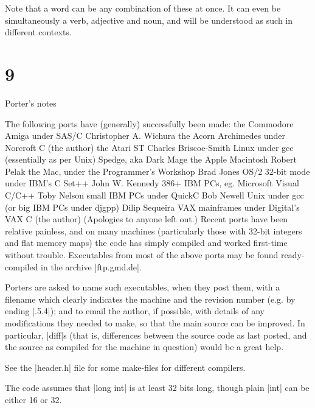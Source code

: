 Note that a word can be any combination of these at once.  It can even be
simultaneously a verb, adjective and noun, and will be understood as such
in different contexts.

\vfill\eject
\section{9}{Porter's notes}

The following ports have (generally) successfully been made:
\beginstt
  the Commodore Amiga under SAS/C              Christopher A. Wichura
  the Acorn Archimedes under Norcroft C        (the author)
  the Atari ST                                 Charles Briscoe-Smith
  Linux under gcc (essentially as per Unix)    Spedge, aka Dark Mage
  the Apple Macintosh                          Robert Pelak
  the Mac, under the Programmer's Workshop     Brad Jones
  OS/2 32-bit mode under IBM's C Set++         John W. Kennedy
  386+ IBM PCs, eg. Microsoft Visual C/C++     Toby Nelson
  small IBM PCs under QuickC                   Bob Newell
  Unix under gcc (or big IBM PCs under djgpp)  Dilip Sequeira
  VAX mainframes under Digital's VAX C         (the author)
\endtt
(Apologies to anyone left out.)  Recent ports have been relative painless,
and on many machines (particularly those with 32-bit integers and flat
memory maps) the code has simply compiled and worked first-time without
trouble.  Executables from most of the above ports may be found
ready-compiled in the archive |ftp.gmd.de|.

Porters are asked to name such executables, when they post them, with
a filename which clearly indicates the machine and the revision number
(e.g. by ending |.5.4|); and to email the author, if possible, with
details of any modifications they needed to make, so that the main
source can be improved.  In particular, |diff|s (that is, differences
between the source code as last posted, and the source as compiled
for the machine in question) would be a great help.

See the |header.h| file for some make-files for different compilers.

The code assumes that |long int| is at least 32 bits long, though
plain |int| can be either 16 or 32.

